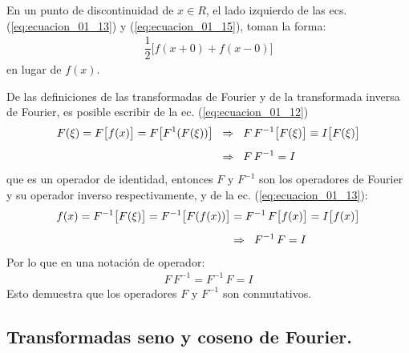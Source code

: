 En un punto de discontinuidad de $x \in R$, el lado izquierdo de las ecs. (\ref{eq:ecuacion_01_13}) y (\ref{eq:ecuacion_01_15}), toman la forma:
\begin{align*}
\dfrac{1}{2} \big[ f(x + 0) + f(x - 0) \big]
\end{align*}
en lugar de $f(x)$.
\par
De las definiciones de las transformadas de Fourier y de la transformada inversa de Fourier, es posible escribir de la ec. (\ref{eq:ecuacion_01_12})
\begin{align*}
F(\xi) = F \big[f(x) \big] = F \big[ F^{1} (F(\xi))\big] \hspace{0.2cm} &\Rightarrow \hspace{0.2cm} F \, F^{-1} \big[ F(\xi)\big] \equiv I \big[ F(\xi)\big] \\[0.5em]
&\Rightarrow \hspace{0.2cm} F \, F^{-1} = I
\end{align*}
que es un operador de identidad, entonces $F$ y $F^{-1}$ son los operadores de Fourier y
su operador inverso respectivamente, y de la ec. (\ref{eq:ecuacion_01_13}):
\begin{align}
\begin{aligned}[b]
f(x) = F^{-1} \big[F(\xi)\big] = F^{-1} \big[F(f(x))\big] &= F^{-1} \, F \big[f(x)\big] = I \big[f(x)\big] \\[0.5em]
&\Rightarrow \hspace{0.2cm} F^{-1} \, F = I
\end{aligned}
\label{eq:ecuacion_01_16}
\end{align}
Por lo que en una notación de operador:
\begin{align*}
F \, F^{-1} = F^{-1} \, F = I
\end{align*}
Esto demuestra que los operadores $F$ y $F^{-1}$ son conmutativos.

\subsection{Transformadas seno y coseno de Fourier.}

